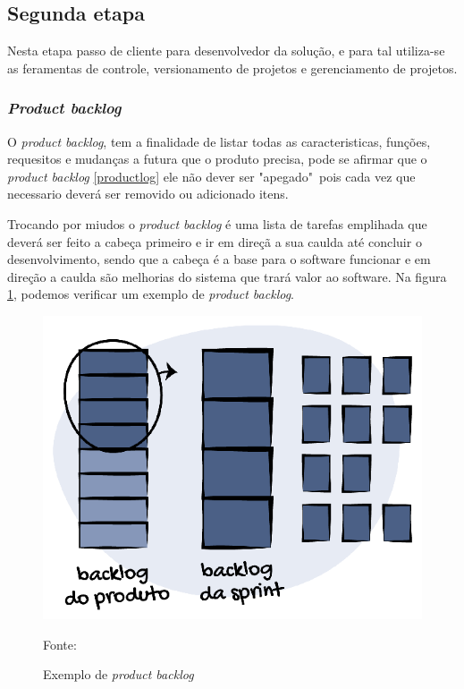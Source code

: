 \subsection{Segunda etapa}
\par Nesta etapa passo de cliente para desenvolvedor da solução, e para tal utiliza-se as feramentas de controle, versionamento de projetos e gerenciamento de projetos.


\subsubsection{\textit{Product backlog}}
\par O \textit{product backlog}, tem a finalidade de listar todas as caracteristicas, funções, requesitos e mudanças a futura que o produto precisa, pode se afirmar que o \textit{product backlog} \ref{productlog} ele não dever ser "apegado"\ pois cada vez que necessario deverá ser removido ou adicionado itens.
\par Trocando por miudos o \textit{product backlog} é uma lista de tarefas emplihada que deverá ser feito a cabeça primeiro e ir em direçã a sua caulda até concluir o desenvolvimento, sendo que a cabeça é a base para o software funcionar e em direção a caulda são melhorias do sistema que trará valor ao software. Na figura \ref{priorizacao-backlog}, podemos verificar um exemplo de \textit{product backlog}.
\begin{figure}[H] %
  \center
  \caption{Exemplo de \textit{product backlog}}

  \includegraphics[width=\textwidth]{figure/priorizacao-backlog.png}

  \raggedright
  {\fontsize{10pt}{\baselineskip}\selectfont Fonte: }
  \label{priorizacao-backlog}
\end{figure}


